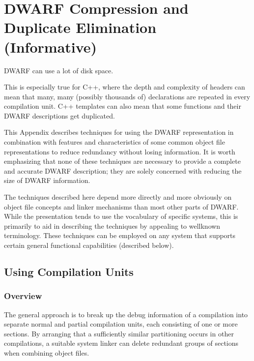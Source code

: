 \chapter[Compression (Informative)]{DWARF Compression and Duplicate Elimination (Informative)}
\label{dwarfcompressionandduplicateeliminationinformative}


DWARF can use a lot of disk space.

This is especially true for C++, where the depth and complexity
of headers can mean that many, many (possibly thousands of)
declarations are repeated in every compilation unit. C++
templates can also mean that some functions and their DWARF
descriptions get duplicated.

This Appendix describes techniques for using the DWARF
representation in combination with features and characteristics
of some common object file representations to reduce redundancy
without losing information. It is worth emphasizing that none
of these techniques are necessary to provide a complete and
accurate DWARF description; they are solely concerned with
reducing the size of DWARF information.

The techniques described here depend more directly and more
obviously on object file concepts and linker mechanisms than
most other parts of DWARF. While the presentation tends to
use the vocabulary of specific systems, this is primarily to
aid in describing the techniques by appealing to well\dash known
terminology. These techniques can be employed on any system
that supports certain general functional capabilities
(described below).


\section{Using Compilation Units}
\label{app:usingcompilationunits}

\subsection{Overview}
The general approach is to break up the debug information of
a compilation into separate normal and partial compilation
units, each consisting of one or more sections. By arranging
that a sufficiently similar partitioning occurs in other
compilations, a suitable system linker can delete redundant
groups of sections when combining object files.

